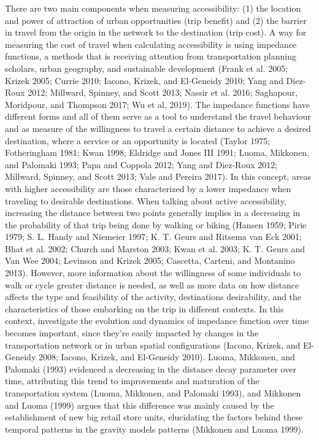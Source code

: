 \documentclass[preprint, 3p,
authoryear]{elsarticle} %
\begin{document}
There are two main components when measuring accessibility: (1) the
location and power of attraction of urban opportunities (trip benefit)
and (2) the barrier in travel from the origin in the network to the
destination (trip cost). A way for measuring the cost of travel when
calculating accessibility is using impedance functions, a methods that
is receiving attention from transportation planning scholars, urban
geography, and sustainable development (Frank et al. 2005; Krizek 2005;
Currie 2010; Iacono, Krizek, and El-Geneidy 2010; Yang and Diez-Roux
2012; Millward, Spinney, and Scott 2013; Nassir et al. 2016; Saghapour,
Moridpour, and Thompson 2017; Wu et al. 2019). The impedance functions
have different forms and all of them serve as a tool to understand the
travel behaviour and as measure of the willingness to travel a certain
distance to achieve a desired destination, where a service or an
opportunity is located (Taylor 1975; Fotheringham 1981; Kwan 1998;
Eldridge and Jones III 1991; Luoma, Mikkonen, and Palomaki 1993; Papa
and Coppola 2012; Yang and Diez-Roux 2012; Millward, Spinney, and Scott
2013; Vale and Pereira 2017). In this concept, areas with higher
accessibility are those characterized by a lower impedance when
traveling to desirable destinations. When talking about active
accessibility, increasing the distance between two points generally
implies in a decreasing in the probability of that trip being done by
walking or biking (Hansen 1959; Pirie 1979; S. L. Handy and Niemeier
1997; K. T. Geurs and Ritsema van Eck 2001; Bhat et al. 2002; Church and
Marston 2003; Kwan et al. 2003; K. T. Geurs and Van Wee 2004; Levinson
and Krizek 2005; Cascetta, Carteni, and Montanino 2013). However, more
information about the willingness of some individuals to walk or cycle
greater distance is needed, as well as more data on how distance affects
the type and feasibility of the activity, destinations desirability, and
the characteristics of those embarking on the trip in different
contexts. In this context, investigate the evolution and dynamics of
impedance function over time becomes important, since they're easily
impacted by changes in the transportation network or in urban spatial
configurations (Iacono, Krizek, and El-Geneidy 2008; Iacono, Krizek, and
El-Geneidy 2010). Luoma, Mikkonen, and Palomaki (1993) evidenced a
decreasing in the distance decay parameter over time, attributing this
trend to improvements and maturation of the transportation system
(Luoma, Mikkonen, and Palomaki 1993), and Mikkonen and Luoma (1999)
argues that this difference was mainly caused by the establishment of
new big retail store units, elucidating the factors behind these
temporal patterns in the gravity models patterns (Mikkonen and Luoma
1999).
\end{document}
